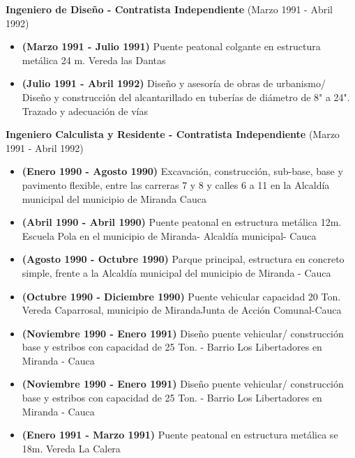 \documentclass[letterpaper,10pt]{article}
\begin{document}
  \vspace*{0.1cm}
  \textbf{Ingeniero de Diseño - Contratista Independiente} (Marzo 1991 - Abril 1992)
  \hfill
  \vspace*{0.1cm}
  \begin{minipage}{\linewidth}
    \begin{itemize}[noitemsep]
      \item \textbf{(Marzo 1991 - Julio 1991)} Puente peatonal colgante en estructura metálica 24 m. Vereda las Dantas
      \item \textbf{(Julio 1991 - Abril 1992)} Diseño y asesoría de obras de urbanismo/ Diseño y construcción del alcantarillado en tuberías de diámetro de 8" a 24". Trazado y adecuación de vías
    \end{itemize}
    \hfill
  \end{minipage}
  
  \vspace*{0.1cm}
  \textbf{Ingeniero Calculista y Residente - Contratista Independiente} (Marzo 1991 - Abril 1992)
  \hfill
  \vspace*{0.1cm}
  \begin{minipage}{\linewidth}
    \begin{itemize}[noitemsep]
      \item \textbf{(Enero 1990 - Agosto 1990)} Excavación, construcción, sub-base, base y pavimento flexible, entre las carreras 7 y 8 y calles 6 a 11 en la Alcaldía municipal del municipio de Miranda Cauca
      \item \textbf{(Abril 1990 - Abril 1990)} Puente peatonal en estructura metálica 12m. Escuela Pola en el municipio de Miranda- Alcaldía municipal- Cauca
      \item \textbf{(Agosto 1990 - Octubre 1990)} Parque principal, estructura en concreto simple, frente a la Alcaldía municipal del municipio de Miranda - Cauca
      \item \textbf{(Octubre 1990 - Diciembre 1990)} Puente vehicular capacidad 20 Ton. Vereda Caparrosal, municipio de MirandaJunta de Acción Comunal-Cauca
      \item \textbf{(Noviembre 1990 - Enero 1991)} Diseño puente vehicular/ construcción base y estribos con capacidad de 25 Ton. - Barrio Los Libertadores en Miranda - Cauca
      \item \textbf{(Noviembre 1990 - Enero 1991)} Diseño puente vehicular/ construcción base y estribos con capacidad de 25 Ton. - Barrio Los Libertadores en Miranda - Cauca
      \item \textbf{(Enero 1991 - Marzo 1991)} Puente peatonal en estructura metálica se 18m. Vereda La Calera
    \end{itemize}
    \hfill
  \end{minipage}
\end{document}
